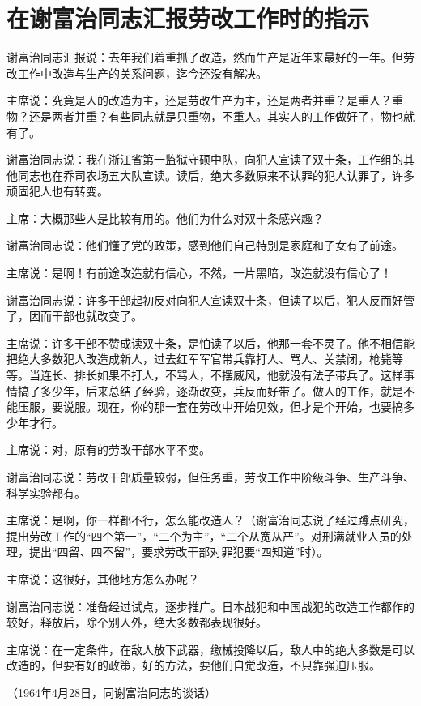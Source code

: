 \section[在谢富治同志汇报劳改工作时的指示（一九六四年四月二十八日）]{在谢富治同志汇报劳改工作时的指示}


谢富治同志汇报说：去年我们着重抓了改造，然而生产是近年来最好的一年。但劳改工作中改造与生产的关系问题，迄今还没有解决。

主席说：究竟是人的改造为主，还是劳改生产为主，还是两者并重？是重人？重物？还是两者并重？有些同志就是只重物，不重人。其实人的工作做好了，物也就有了。

谢富治同志说：我在浙江省第一监狱守硕中队，向犯人宣读了双十条，工作组的其他同志也在乔司农场五大队宣读。读后，绝大多数原来不认罪的犯人认罪了，许多顽固犯人也有转变。

主席：大概那些人是比较有用的。他们为什么对双十条感兴趣？

谢富治同志说：他们懂了党的政策，感到他们自己特别是家庭和子女有了前途。

主席说：是啊！有前途改造就有信心，不然，一片黑暗，改造就没有信心了！

谢富治同志说：许多干部起初反对向犯人宣读双十条，但读了以后，犯人反而好管了，因而干部也就改变了。

主席说：许多干部不赞成读双十条，是怕读了以后，他那一套不灵了。他不相信能把绝大多数犯人改造成新人，过去红军军官带兵靠打人、骂人、关禁闭，枪毙等等。当连长、排长如果不打人，不骂人，不摆威风，他就没有法子带兵了。这样事情搞了多少年，后来总结了经验，逐渐改变，兵反而好带了。做人的工作，就是不能压服，要说服。现在，你的那一套在劳改中开始见效，但才是个开始，也要搞多少年才行。

主席说：对，原有的劳改干部水平不变。

谢富治同志说：劳改干部质量较弱，但任务重，劳改工作中阶级斗争、生产斗争、科学实验都有。

主席说：是啊，你一样都不行，怎么能改造人？（谢富治同志说了经过蹲点研究，提出劳改工作的“四个第一”，“二个为主”，“二个从宽从严”。对刑满就业人员的处理，提出“四留、四不留”，要求劳改干部对罪犯要“四知道”时）。

主席说：这很好，其他地方怎么办呢？

谢富治同志说：准备经过试点，逐步推广。日本战犯和中国战犯的改造工作都作的较好，释放后，除个别人外，绝大多数都表现很好。

主席说：在一定条件，在敌人放下武器，缴械投降以后，敌人中的绝大多数是可以改造的，但要有好的政策，好的方法，要他们自觉改造，不只靠强迫压服。

{\raggedleft （1964年4月28日，同谢富治同志的谈话）\par}


